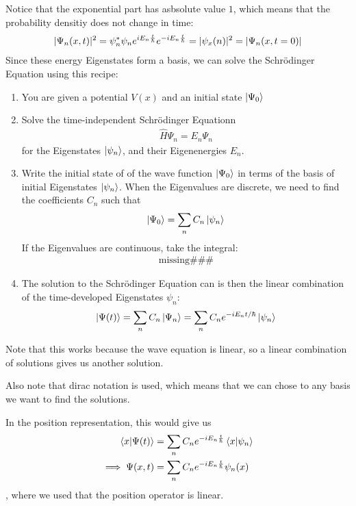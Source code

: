 Notice that the exponential part has asbsolute value $1$, which means that the probability densitiy does not change in time:
\begin{align*}
	\vert\Psi_n(x,t)\vert^{2} = \psi_n^*\psi_n e^{iE_n \frac{t}{\hbar}}e^{-i E_n \frac{t}{\hbar}} = \vert\psi_x(n)\vert^{2} = \vert\Psi_n(x,t=0)\vert
\end{align*}
Since these energy Eigenstates form a basis, we can solve the Schrödinger Equation using this recipe:
\begin{ntheorem}
\begin{enumerate}
	\item You are given a potential $V(x)$ and an initial state $\ket{\Psi_0}$
	\item Solve the time-independent Schrödinger Equationn
	\begin{align*}
		\hat{H} \Psi_n = E_n \Psi_n
	\end{align*}
	for the Eigenstates $\ket{\psi_n}$, and their Eigenenergies $E_n$.
\item Write the initial state of of the wave function $\ket{\Psi_0}$ in terms of the basis of initial Eigenstates $\ket{\psi_n}$. When the Eigenvalues are discrete, we need to find the coefficients $C_n$ such that
	 \begin{align*}
		 \ket{\Psi_0} = \sum_{n} C_n\ket{\psi_n}
	 \end{align*}
	If the Eigenvalues are continuous, take the integral:
	\begin{align*}
		\text{missing} \#\#\#
	\end{align*}
\item The solution to the Schrödinger Equation can is then the linear combination of the time-developed Eigenstates $\psi_n$:
	\begin{align*}
		\ket{\Psi(t)} = \sum_{n}C_n \ket{\Psi_n} = \sum_{n} C_n e^{-iE_nt/\hbar} \ket{\psi_n}
	\end{align*}
\end{enumerate}
Note that this works because the wave equation is linear, so a linear combination of solutions gives us another solution.

Also note that dirac notation is used, which means that we can chose to any basis we want to find the solutions.

In the position representation, this would give us
\begin{align*}
	\braket{x| \Psi(t)} &= \sum_{n}C_n e^{-iE_n \frac{t}{\hbar}}\braket{x|\psi_n}\\
	\implies \Psi(x,t) &= \sum_{n}C_n e^{-iE_n \frac{t}{\hbar}}\psi_n(x)
\end{align*}
, where we used that the position operator is linear.
\end{ntheorem}

